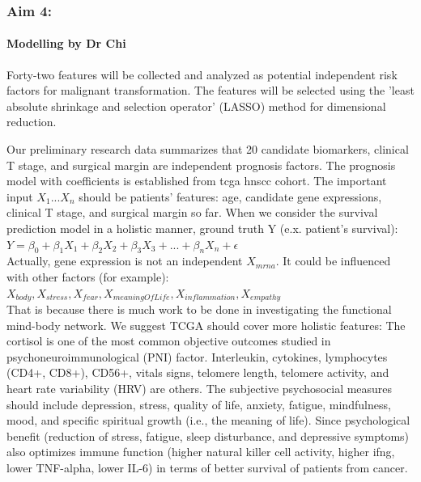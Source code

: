 \documentclass[12pt, a4paper]{article}
\begin{document}
\clearpage
\subsubsection*{Aim 4:}


\paragraph{Modelling by Dr Chi}
Forty-two features will be collected and analyzed as potential independent risk factors for malignant transformation. 
The features will be selected using the 'least absolute shrinkage and selection operator' (LASSO) method for dimensional reduction.

Our preliminary research data summarizes that 20 candidate biomarkers, clinical T stage, and surgical margin are independent prognosis factors.
The prognosis model with coefficients is established from \acrshort{tcga} \acrshort{hnscc} cohort. The important input $X_1...X_n$ should be patients' features: age, candidate gene expressions, clinical T stage, and surgical margin so far.
When we consider the survival prediction model in a holistic manner,
ground truth Y (e.x. patient's survival):\\[0.5cm]
$Y = \beta_0 + \beta_1 X_1 + \beta_2 X_2 + \beta_3 X_3 + ... + \beta_n X_n + \epsilon$\\[0.3cm]
Actually, gene expression is not an independent $X_{mrna}$. It could be influenced with other factors (for example):\\[0.3cm]
$X_{body}, X_{stress}, X_{fear}, X_{meaningOfLife}, X_{inflammation}, X_{empathy}$\\[0.3cm]
That is because there is much work to be done in investigating the functional mind-body network\citep{Rogers1959}.
We suggest TCGA should cover more holistic features:
The cortisol is one of the most common objective outcomes studied in psychoneuroimmunological (PNI) factor. Interleukin, cytokines, lymphocytes (CD4+, CD8+), CD56+, vitals signs, telomere length, telomere activity, and heart rate variability (HRV) are others.
The subjective psychosocial measures should include depression, stress, quality of life, anxiety, fatigue, mindfulness, mood, and specific spiritual growth (i.e., the meaning of life)\citep{Hsiao2012}.
Since psychological benefit (reduction of stress, fatigue, sleep disturbance, and depressive symptoms) also optimizes immune function (higher natural killer cell activity, higher \acrshort{ifng}, lower TNF-alpha, lower IL-6) in terms of better survival of patients from cancer.
\end{document}
